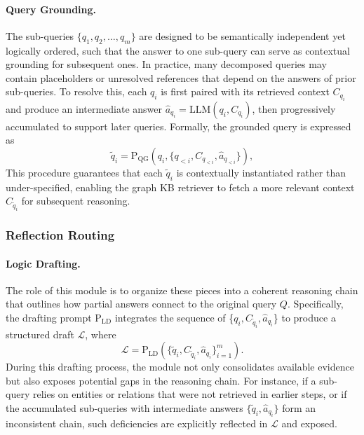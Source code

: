 \paragraph{Query Grounding.}
The sub-queries $\{q_1, q_2, \dots, q_m\}$ are designed to be semantically independent yet logically ordered, such that the answer to one sub-query can serve as contextual grounding for subsequent ones. In practice, many decomposed queries may contain placeholders or unresolved references that depend on the answers of prior sub-queries. To resolve this, each $q_i$ is first paired with its retrieved context $C_{q_i}$ and produce an intermediate answer $\hat{a}_{q_i} = \mathrm{LLM}(q_i, C_{q_i})$, then progressively accumulated to support later queries. Formally, the grounded query is expressed as
\begin{equation}
    \tilde{q}_i = \mathrm{P}_{\mathrm{QG}}(q_i, \{q_{<i}, C_{q_{<i}}, \hat{a}_{q_{<i}}\}),
\end{equation}
This procedure guarantees that each $\tilde{q}_i$ is contextually instantiated rather than under-specified, enabling the graph KB retriever to fetch a more relevant context $C_{\tilde{q}_i}$ for subsequent reasoning.


\subsubsection{Reflection Routing}

\paragraph{Logic Drafting.}
The role of this module is to organize these pieces into a coherent reasoning chain that outlines how partial answers connect to the original query $Q$. Specifically, the drafting prompt $\mathrm{P}_{\mathrm{LD}}$ integrates the sequence of \{$q_i, C_{\tilde{q}_i}, \hat{a}_{q_i}$\} to produce a structured draft $\mathcal{L}$, where
\begin{equation}
    \mathcal{L} = \mathrm{P}_{\mathrm{LD}}(\{\tilde{q}_i, C_{\tilde{q}_i}, \hat{a}_{q_i}\}_{i=1}^m).
\end{equation}
During this drafting process, the module not only consolidates available evidence but also exposes potential gaps in the reasoning chain. For instance, if a sub-query relies on entities or relations that were not retrieved in earlier steps, or if the accumulated sub-queries with intermediate answers $\{\tilde{q}_i, \hat{a}_{q_i}\}$ form an inconsistent chain, such deficiencies are explicitly reflected in $\mathcal{L}$ and exposed.

